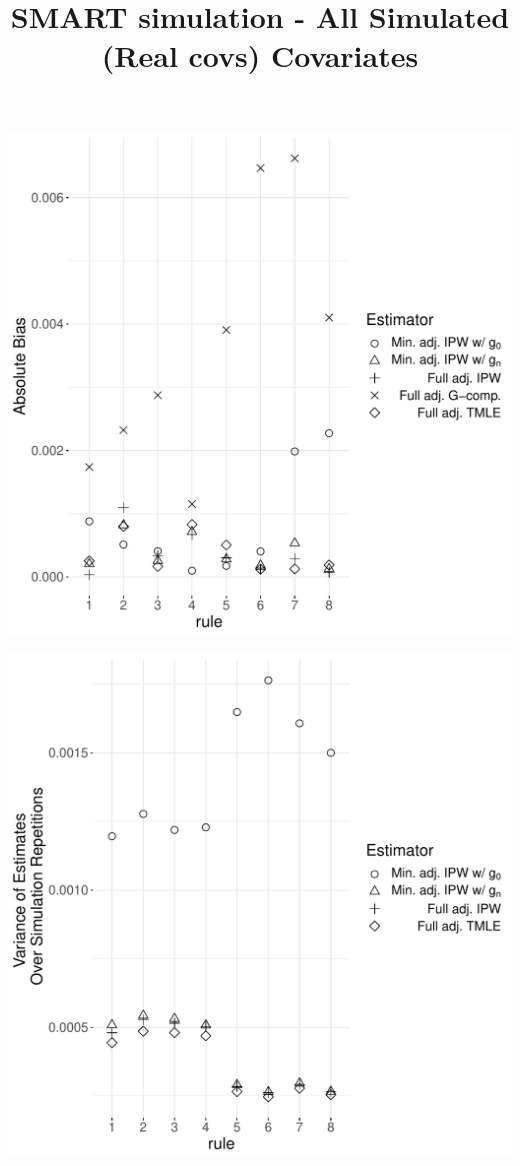 \documentclass[11pt]{article}\usepackage[]{graphicx}\usepackage[]{color}
\makeatletter
\def\maxwidth{ %
  \ifdim\Gin@nat@width>\linewidth
    \linewidth
  \else
    \Gin@nat@width
  \fi
}
\makeatother
\begin{document}
\title{SMART simulation - All Simulated (Real covs) Covariates}
\date{}

\maketitle













\includegraphics[width=\maxwidth]{figure/unnamed-chunk-3-1} 

\includegraphics[width=\maxwidth]{figure/unnamed-chunk-3-2} 
\end{document}
